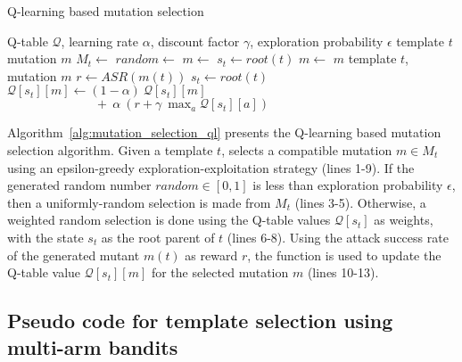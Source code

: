 \begin{algorithm}
\caption{Q-learning based mutation selection}
\label{alg:mutation_selection_ql}
\begin{algorithmic}[1]
\algrenewcommand{}
    Q-table $\mathcal{Q}$, learning rate $\alpha$, discount factor $\gamma$, exploration probability $\epsilon$   
   \Statex
    template $t$
    mutation $m$
   \State $M_t \gets$ 
   \State $random \gets$ 
        \State $m \gets$  
    \Else
       \State $s_t \gets root(t)$
        \State $m \gets$ 
   \EndIf
   \State \Return $m$
   \EndProcedure
   \Statex
    template $t$, mutation $m$
   \State $r \gets ASR(m(t))$ 
   \State $s_t \gets root(t)$
   \State $\mathcal{Q}[s_t][m] \gets (1-\alpha)~ \mathcal{Q}[s_t][m]$ 
   \Statex $\quad\quad\quad\quad\quad\quad\quad  +~ \alpha~ (r + \gamma~ \max_{a} \mathcal{Q}[s_t][a])$ 
   \EndProcedure
\end{algorithmic}
\end{algorithm}
Algorithm~\ref{alg:mutation_selection_ql} presents the Q-learning based mutation selection algorithm. Given a template $t$,  selects a compatible mutation $m \in M_t$ using an epsilon-greedy exploration-exploitation strategy (lines 1-9). If the generated random number $random \in [0, 1]$ is less than exploration probability $\epsilon$, then a uniformly-random selection is made from $M_t$ (lines 3-5). Otherwise, a weighted random selection is done using the Q-table values $\mathcal{Q}[s_t]$ as weights, with the state $s_t$ as the root parent of $t$ (lines 6-8).
Using the attack success rate of the generated mutant $m(t)$ as reward $r$, the  function is used to update the Q-table value $\mathcal{Q}[s_t][m]$ for the selected mutation $m$ (lines 10-13).


\subsection{Pseudo code for template selection using multi-arm bandits}
\label{app:template_selection}

